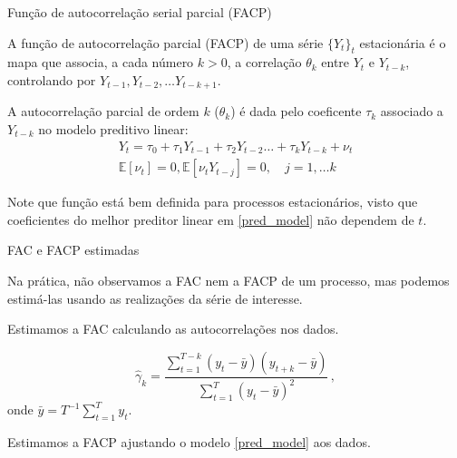 \documentclass[11pt]{beamer}
\newenvironment{halfwideitemize}{\itemize\addtolength{\itemsep}{0.5em}}{\enditemize}
\begin{document}
\begin{frame}{Função de autocorrelação serial parcial (FACP)}
	\begin{halfwideitemize}
		\item A {\color{blue}função de autocorrelação parcial (FACP)} de uma série $\{Y_t\}_t$ estacionária é o mapa que associa, a cada número $k > 0$, a correlação $\theta_k$ entre $Y_{t}$ e $Y_{t-k}$, {\color{blue}controlando por $Y_{t-1}, Y_{t-2}, \ldots Y_{t-k+1}$}.

	
		

	
		\item A autocorrelação parcial de ordem $k$ ($\theta_k$) é dada pelo coeficente $\tau_k$ associado a $Y_{t-k}$ no modelo preditivo linear:
	\begin{equation}
		\label{pred_model}
		\begin{aligned}
			Y_t = \tau_0 + \tau_1 Y_{t-1} + \tau_2 Y_{t-2} \ldots + \tau_k Y_{t-k} + \nu_t \\
			\mathbb{E}[\nu_t] = 0, \mathbb{E}[\nu_t Y_{t-j}] = 0,\quad j=1,\ldots k
		\end{aligned}
	\end{equation}
	\item Note que função está bem definida para processos estacionários, visto que coeficientes do melhor preditor linear em \eqref{pred_model} não dependem de $t$.
		\end{halfwideitemize}
\end{frame}
\begin{frame}{FAC e FACP estimadas}
	\begin{halfwideitemize}
		\item Na prática, não observamos a FAC nem a FACP de um processo, mas podemos estimá-las usando as realizações da série de interesse.
		\begin{halfwideitemize}
			\item Estimamos a FAC calculando as autocorrelações nos dados.
			
			$$\hat{\gamma}_k = \frac{\sum_{t=1}^{T-k} (y_{t}-\bar{y})(y_{t+k}-\bar{y})}{\sum_{t=1}^{T}(y_t-\bar{y})^2} \, ,$$
			onde $\bar{y} = T^{-1}\sum_{t=1}^T y_t$.
			\item Estimamos a FACP ajustando o modelo \eqref{pred_model} aos dados.
		\end{halfwideitemize}
	
	\end{halfwideitemize}
\end{frame}
\end{document}
